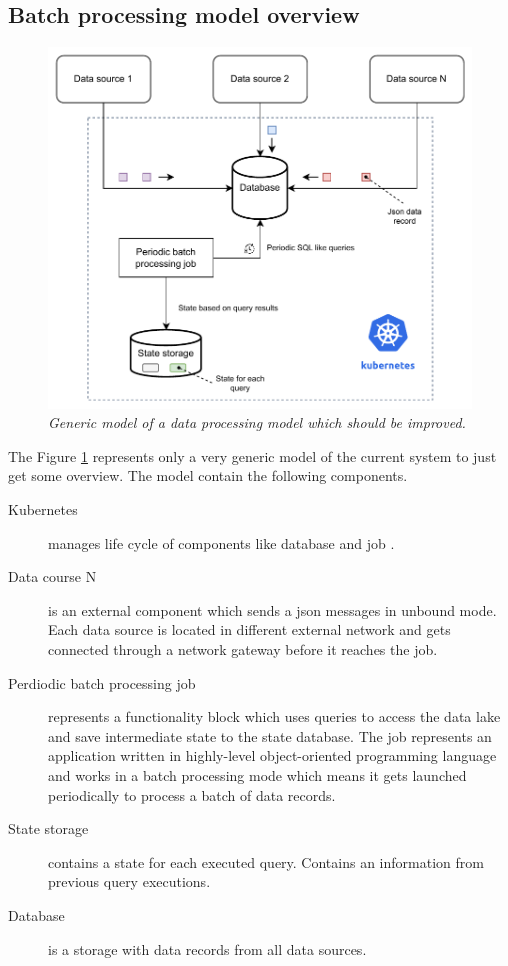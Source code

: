 \subsection{Batch processing model overview}\label{subsec:current-model}

\begin{figure}[ht]
    \centering
    \includegraphics[width=1\textwidth]{figures/current-model-2}
    \caption{\textit{Generic model of a data processing model which should be improved.}}
    \label{fig:current-model}
\end{figure}

The Figure \ref{fig:current-model} represents only a very generic model of the current
system to just get some overview.
The model contain the following components.

\begin{description}
    \item[Kubernetes] manages life cycle of components like database and job \cite{kubernetes_intro}.
    \item[Data course N] is an external component which sends a json messages in unbound mode.
    Each data source is located in different external network and gets connected through
    a network gateway before it reaches the job.
    \item[Perdiodic batch processing job] represents a functionality block which uses queries to access the
    data lake and save intermediate state to the state database.
    The job represents an application written in highly-level object-oriented programming language
    and works in a batch processing mode which means it gets launched periodically to process a batch of data records.
    \item[State storage] contains a state for each executed query.
    Contains an information from previous query executions.
    \item[Database] is a storage with data records from all data sources.
\end{description}

